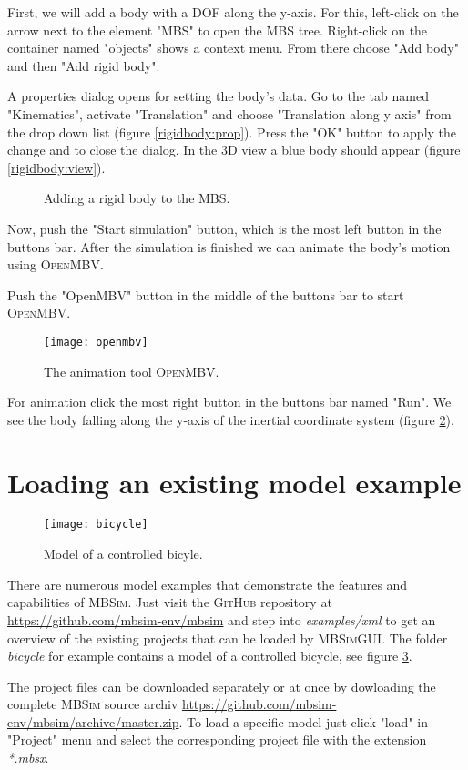 \documentclass[
a4paper,
fleqn,
DIV=15,
pagesize
]{scrartcl}
\begin{document}
First, we will add a body with a DOF along the {\color{green}y-axis}.  For this,
left-click on the arrow next to the element "MBS" to open the MBS tree.
Right-click on the container named "objects" shows a context menu. From there
choose "Add body" and then "Add rigid body".

A properties dialog opens for setting the body's data. Go to the tab named
"Kinematics", activate "Translation" and choose "Translation along y axis" from
the drop down list (figure \ref{rigidbody:prop}). Press the "OK" button to
apply the change and to close the dialog. In the 3D view a blue body should
appear (figure \ref{rigidbody:view}).
\begin{figure}
\centering
{}
\caption{Adding a rigid body to the MBS.} \label{rigidbody}
\end{figure}

Now, push the "Start simulation" button, which is the most left button in the
buttons bar. After the simulation is finished we can animate the body's
motion using \textsc{OpenMBV}.

Push the "OpenMBV" button in the middle of the buttons bar to start
\textsc{OpenMBV}.
\begin{figure}
\centering
\texttt{[image: openmbv]}
\caption{The animation tool \textsc{OpenMBV}.} \label{openmbv}
\end{figure}
For animation click
the most right button in the buttons bar named "Run". We see the body falling
along the {\color{green}y-axis} of the inertial coordinate system (figure
\ref{openmbv}).

\section{Loading an existing model example}

\begin{figure}
\centering
\texttt{[image: bicycle]}
\caption{Model of a controlled bicyle.} \label{bicycle}
\end{figure}
There are numerous model examples that demonstrate the features and capabilities of \textsc{MBSim}. Just visit the \textsc{GitHub} repository at \url{https://github.com/mbsim-env/mbsim} and step into \emph{examples/xml} to get an overview of the existing projects that can be loaded by \textsc{MBSimGUI}. The folder \emph{bicycle} for example contains a model of a controlled bicycle, see figure \ref{bicycle}.

The project files can be downloaded separately or at once by dowloading the complete \textsc{MBSim} source archiv \url{https://github.com/mbsim-env/mbsim/archive/master.zip}. To load a specific model just click "load" in "Project" menu and select the corresponding project file with the extension \emph{*.mbsx}.
\end{document}
